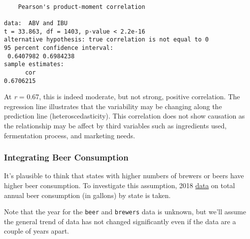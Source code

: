 \documentclass[]{article}
\begin{document}
\begin{verbatim}

    Pearson's product-moment correlation

data:  ABV and IBU
t = 33.863, df = 1403, p-value < 2.2e-16
alternative hypothesis: true correlation is not equal to 0
95 percent confidence interval:
 0.6407982 0.6984238
sample estimates:
      cor 
0.6706215 
\end{verbatim}

At \emph{r} = 0.67, this is indeed moderate, but not strong, positive
correlation. The regression line illustrates that the variability may be
changing along the prediction line (heteroscedasticity). This
correlation does not show causation as the relationship may be affect by
third variables such as ingredients used, fermentation process, and
marketing needs.

\hypertarget{integrating-beer-consumption}{%
\subsubsection{Integrating Beer
Consumption}\label{integrating-beer-consumption}}

It's plausible to think that states with higher numbers of brewers or
beers have higher beer consumption. To investigate this assumption, 2018
\href{https://www.usatoday.com/story/money/personalfinance/2018/05/02/which-states-residents-drink-most-beer/569430002/}{data}
on total annual beer consumption (in gallons) by state is taken.

Note that the year for the \texttt{beer} and \texttt{brewers} data is
unknown, but we'll assume the general trend of data has not changed
significantly even if the data are a couple of years apart.
\end{document}
